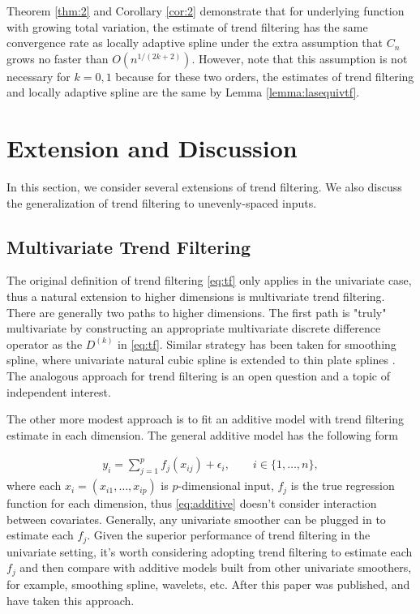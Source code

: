 \documentclass[a4paper]{article}
\begin{document}
Theorem \ref{thm:2} and Corollary \ref{cor:2} demonstrate that for underlying function with growing total variation, the estimate of trend filtering has the same convergence rate as locally adaptive spline under the extra assumption that $C_n$ grows no faster than $O(n^{1/(2k+2)})$. However, note that this assumption is not necessary for $k = 0, 1$ because for these two orders, the estimates of trend filtering and locally adaptive spline are the same by Lemma \ref{lemma:lasequivtf}.

\section{Extension and Discussion}
\label{sec:extension}
In this section, we consider several extensions of trend filtering. We also discuss the generalization of trend filtering to unevenly-spaced inputs. 

\subsection{Multivariate Trend Filtering}
The original definition of trend filtering \eqref{eq:tf} only applies in the univariate case, thus a natural extension to higher dimensions is multivariate trend filtering. There are generally two paths to higher dimensions. The first path is "truly" multivariate by constructing an appropriate multivariate discrete difference operator as the $D^{(k)}$ in \eqref{eq:tf}. Similar strategy has been taken for smoothing spline, where univariate natural cubic spline is extended to thin plate splines \cite{green1993nonparametric,wahba1990spline}. The analogous approach for trend filtering is an open question and a topic of independent interest.

The other more modest approach is to fit an additive model with trend filtering estimate in each dimension. The general additive model \cite{hastie1990generalized} has the following form

\begin{align}
y_i = \sum_{j=1}^pf_j(x_{ij}) + \epsilon_i, \qquad i\in\{1,\ldots, n\},
\label{eq:additive}
\end{align}
where each $x_i=(x_{i1},\ldots, x_{ip})$ is $p$-dimensional input, $f_j$ is the true regression function for each dimension, thus \eqref{eq:additive} doesn't consider interaction between covariates. Generally, any univariate smoother can be plugged in to estimate each $f_j$. Given the superior performance of trend filtering in the univariate setting, it's worth considering adopting trend filtering to estimate each $f_j$ and then compare with additive models built from other univariate smoothers, for example, smoothing spline, wavelets, etc. After this paper was published, \cite{sadhanala2017additive} and \cite{petersen2016fused} have taken this approach.
\end{document}
